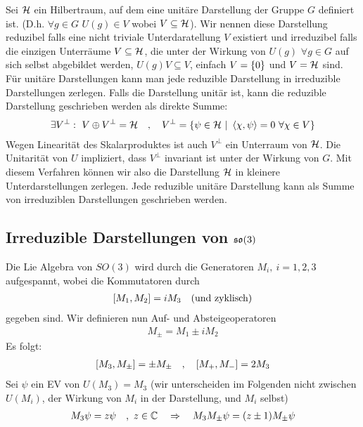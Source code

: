Sei $\mathcal{H}$ ein Hilbertraum, auf dem eine unitäre Darstellung der Gruppe $G$
definiert ist. (D.h. $\forall g \in G$ $U(g) \in V$ wobei $V \subseteq \mathcal{H}$).
Wir nennen diese Darstellung reduzibel falls eine nicht triviale Unterdaratellung
$V$ existiert und irreduzibel falls die einzigen Unterräume $V \subseteq \mathcal{H}$,
die unter der Wirkung von $U(g)$ $\forall g \in G$ auf sich selbst abgebildet
werden, $U(g) V \subseteq V$, einfach $V = \left\{ 0 \right\}$ und $V = \mathcal{H}$
sind. Für unitäre Darstellungen kann man jede reduzible Darstellung in
irreduzible Darstellungen zerlegen. Falls die Darstellung unitär ist, kann die
reduzible Darstellung geschrieben werden als direkte Summe:
\begin{align*}
    \exists V^\perp : \ V \oplus V^\perp = \H
    \hspace{10pt} , \hspace{10pt}
    V^\perp = \geschwungeneklammer{\psi \in \H \ | \ \scalprod{\chi}{\psi} = 0 \ \forall \chi \in V}
\end{align*}
Wegen Linearität des Skalarproduktes ist auch $V^\perp$ ein Unterraum von $\mathcal{H}$.
Die Unitarität von $U$ impliziert, dass $V^\perp$ invariant ist unter der
Wirkung von $G$. Mit diesem Verfahren können wir also die Darstellung $\mathcal{H}$ in
kleinere Unterdarstellungen zerlegen. Jede reduzible unitäre Darstellung kann als
Summe von irreduziblen Darstellungen geschrieben werden.

\subsection{Irreduzible Darstellungen von $\mathfrak{so}(3)$}

Die Lie Algebra von $SO(3)$ wird durch die Generatoren $M_i, \ i = 1,2,3$
aufgespannt, wobei die Kommutatoren durch
\begin{align*}
    \left[ M_1,M_2 \right] = i M_3
    \hspace{10pt} \text{(und zyklisch)}
\end{align*}
gegeben sind. Wir definieren nun Auf- und Absteigeoperatoren
\begin{align*}
    M_{\pm} = M_1 \pm i M_2
\end{align*}
Es folgt:
\begin{align*}
    \left[ M_3 , M_{\pm} \right] = \pm M_\pm
    \hspace{10pt} , \hspace{10pt}
    \left[ M_+ , M_- \right] = 2 M_3
\end{align*}
Sei $\psi$ ein EV von $U(M_3) = M_3$ (wir unterscheiden im Folgenden nicht
zwischen $U(M_i)$, der Wirkung von $M_i$ in der Darstellung, und $M_i$
selbst)
\begin{align*}
    M_3 \psi = z \psi \ \ \ , \ z \in \mathbb{C}
    \hspace{10pt} \Rightarrow \hspace{10pt}
    M_3 M_{\pm} \psi = (z \pm 1) M_{\pm} \psi
\end{align*}

